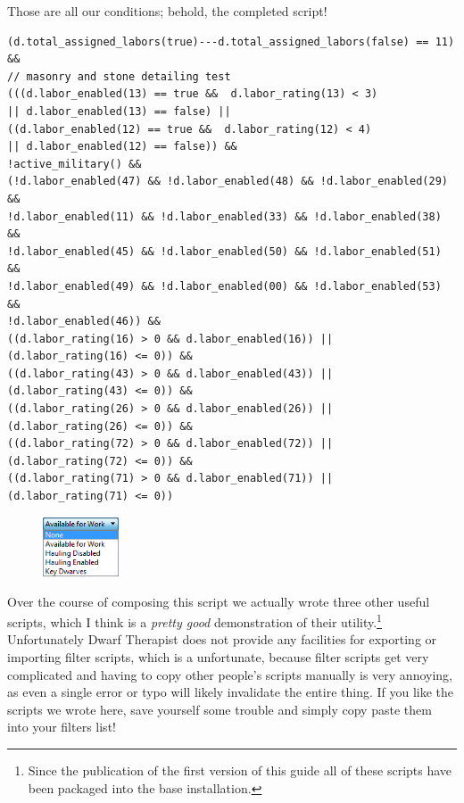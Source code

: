 \documentclass[]{article}
\begin{document}
Those are all our conditions; behold, the completed script!
\begin{verbatim}
(d.total_assigned_labors(true)---d.total_assigned_labors(false) == 11) && 
// masonry and stone detailing test
(((d.labor_enabled(13) == true &&  d.labor_rating(13) < 3)
|| d.labor_enabled(13) == false) || 
((d.labor_enabled(12) == true &&  d.labor_rating(12) < 4)
|| d.labor_enabled(12) == false)) &&
!active_military() &&
(!d.labor_enabled(47) && !d.labor_enabled(48) && !d.labor_enabled(29) &&
!d.labor_enabled(11) && !d.labor_enabled(33) && !d.labor_enabled(38) &&
!d.labor_enabled(45) && !d.labor_enabled(50) && !d.labor_enabled(51) &&
!d.labor_enabled(49) && !d.labor_enabled(00) && !d.labor_enabled(53) &&
!d.labor_enabled(46)) &&
((d.labor_rating(16) > 0 && d.labor_enabled(16)) || (d.labor_rating(16) <= 0)) &&
((d.labor_rating(43) > 0 && d.labor_enabled(43)) || (d.labor_rating(43) <= 0)) &&
((d.labor_rating(26) > 0 && d.labor_enabled(26)) || (d.labor_rating(26) <= 0)) &&
((d.labor_rating(72) > 0 && d.labor_enabled(72)) || (d.labor_rating(72) <= 0)) &&
((d.labor_rating(71) > 0 && d.labor_enabled(71)) || (d.labor_rating(71) <= 0))
\end{verbatim}

\begin{figure}
\vspace{-20pt}
  \begin{center}
    \includegraphics[width=0.2\textwidth]{Sec4Fig4}
  \end{center}
\vspace{-15pt}
\end{figure}
Over the course of composing this script we actually wrote three other useful scripts, which I think is a
\emph{pretty good} demonstration of their utility.\footnote{Since the publication of the first version
of this guide all of these scripts have been packaged into the base installation.} Unfortunately Dwarf
Therapist does not provide any facilities for exporting or importing filter scripts, which is a
unfortunate, because filter scripts get very complicated and having to copy other people's scripts
manually is very annoying, as even a single error or typo will likely invalidate the entire thing. If
you like the scripts we wrote here, save yourself some trouble and simply copy paste them into your
filters list!
\end{document}
